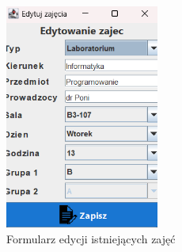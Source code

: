 \begin{figure}[H]
\centering
\includegraphics[width=0.45\textwidth]{figures/workApl/edit_panel.png}
\caption{Formularz edycji istniejących zajęć}
\label{fig:edit_panel}
\end{figure}

